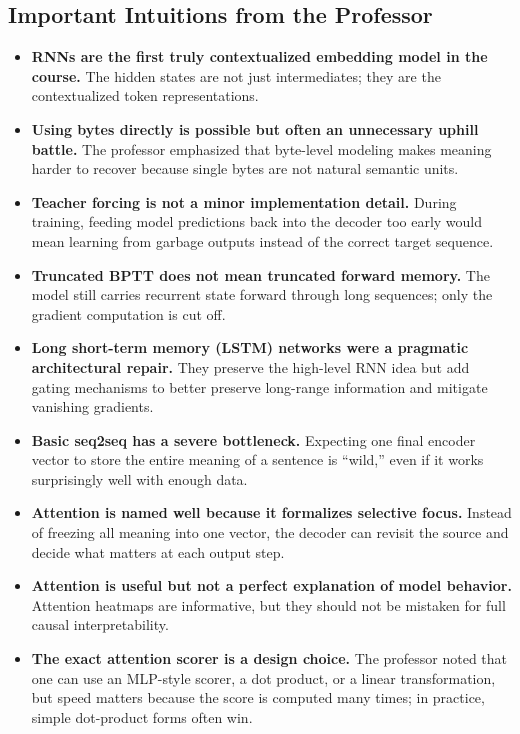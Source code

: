 \documentclass[11pt]{article}
\begin{document}
\subsection{Important Intuitions from the Professor}
\begin{itemize}
    \item \textbf{RNNs are the first truly contextualized embedding model in the course.} The hidden states are not just intermediates; they are the contextualized token representations.
    \item \textbf{Using bytes directly is possible but often an unnecessary uphill battle.} The professor emphasized that byte-level modeling makes meaning harder to recover because single bytes are not natural semantic units.
    \item \textbf{Teacher forcing is not a minor implementation detail.} During training, feeding model predictions back into the decoder too early would mean learning from garbage outputs instead of the correct target sequence.
    \item \textbf{Truncated BPTT does not mean truncated forward memory.} The model still carries recurrent state forward through long sequences; only the gradient computation is cut off.
    \item \textbf{Long short-term memory (LSTM) networks were a pragmatic architectural repair.} They preserve the high-level RNN idea but add gating mechanisms to better preserve long-range information and mitigate vanishing gradients.
    \item \textbf{Basic seq2seq has a severe bottleneck.} Expecting one final encoder vector to store the entire meaning of a sentence is ``wild,'' even if it works surprisingly well with enough data.
    \item \textbf{Attention is named well because it formalizes selective focus.} Instead of freezing all meaning into one vector, the decoder can revisit the source and decide what matters at each output step.
    \item \textbf{Attention is useful but not a perfect explanation of model behavior.} Attention heatmaps are informative, but they should not be mistaken for full causal interpretability.
    \item \textbf{The exact attention scorer is a design choice.} The professor noted that one can use an MLP-style scorer, a dot product, or a linear transformation, but speed matters because the score is computed many times; in practice, simple dot-product forms often win.
\end{itemize}
\end{document}
